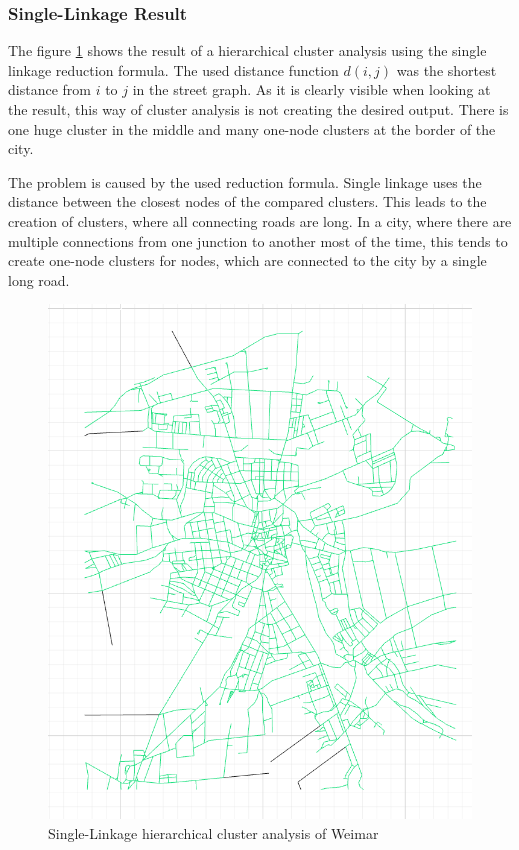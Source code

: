 \documentclass[11pt, a4paper]{report}
\begin{document}
\subsubsection{Single-Linkage Result}
The figure \ref{fig:SingleLinkage} shows the result of a hierarchical cluster analysis using the single linkage reduction formula. The used distance function $d(i, j)$ was the shortest distance from $i$ to $j$ in the street graph. As it is clearly visible when looking at the result, this way of cluster analysis is not creating the desired output. There is one huge cluster in the middle and many one-node clusters at the border of the city.

The problem is caused by the used reduction formula. Single linkage uses the distance between the closest nodes of the compared clusters. This leads to the creation of clusters, where all connecting roads are long. In a city, where there are multiple connections from one junction to another most of the time, this tends to create one-node clusters for nodes, which are connected to the city by a single long road.

\begin{figure}[!h]
    \centering
    \includegraphics[width=\textwidth]{clusteranalysis_singlelinkage.png}
    \caption{Single-Linkage hierarchical cluster analysis of Weimar\label{fig:SingleLinkage}}
\end{figure}
\end{document}
